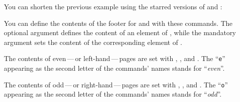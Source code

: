 \begin{Example}
  You can shorten the previous example using the starred versions of
   and :
%
\end{Example}%
\EndIndexGroup


\begin{Declaration}
\end{Declaration}
You can define the contents of the footer for
 and
 with these commands. The
optional argument defines the content of an element of
, while the mandatory argument
sets the content of the corresponding element of
.

The contents of even\,---\,or left-hand\,---\,pages
are set with , , and . The
``\texttt{e}'' appearing as the second letter of the commands' names stands
for ``\emph{even}''.

The contents of odd\,---\,or right-hand\,---\,pages
are set with , , and . The
``\texttt{o}'' appearing as the second letter of the commands' names stands
for ``\emph{odd}''.

